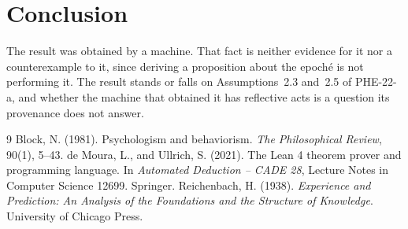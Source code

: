 \documentclass{situationist-preprint}
\begin{document}
\section{Conclusion}

The result was obtained by a machine. That fact is neither evidence for it nor a counterexample to it, since deriving a proposition about the epoché is not performing it. The result stands or falls on Assumptions~2.3 and~2.5 of PHE-22-a, and whether the machine that obtained it has reflective acts is a question its provenance does not answer.

\begin{thebibliography}{9}\small
{} Block, N. (1981). Psychologism and behaviorism. \emph{The Philosophical Review}, 90(1), 5--43.
 de Moura, L., and Ullrich, S. (2021). The Lean 4 theorem prover and programming language. In \emph{Automated Deduction -- CADE 28}, Lecture Notes in Computer Science 12699. Springer.
 Reichenbach, H. (1938). \emph{Experience and Prediction: An Analysis of the Foundations and the Structure of Knowledge}. University of Chicago Press.
\end{thebibliography}
\end{document}

